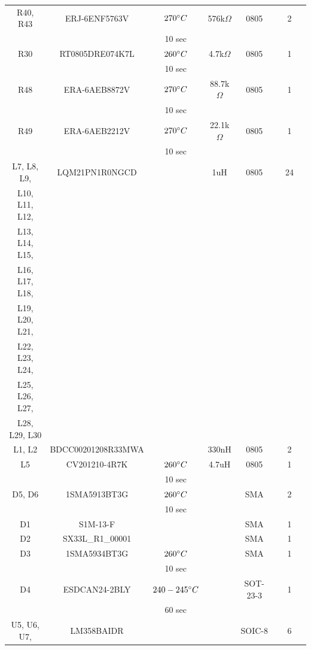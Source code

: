 \documentclass[10pt]{datasheet}
\begin{document}
\begin{longtable}{| c | c | c | c | c | c | c | c |}
    \hline
    R40, R43 & ERJ-6ENF5763V & $270\degree C$ & 576k$\Omega$ & 0805 & \cite{ref36} & 2 &\\
    & & 10 sec & & & & &\\
    \hline
    R30 & RT0805DRE074K7L & $260\degree C$ & 4.7k$\Omega$ & 0805 & \cite{ref27} & 1 &\\
    & & 10 sec & & & & &\\
    \hline
    R48 & ERA-6AEB8872V & $270\degree C$ & 88.7k$\Omega$ & 0805 & \cite{ref37} & 1 &\\
    & & 10 sec & & & & &\\
    \hline
    R49 & ERA-6AEB2212V & $270\degree C$ & 22.1k$\Omega$ & 0805 & \cite{ref37} & 1 &\\
    & & 10 sec & & & & &\\
    \hline
    L7, L8, L9, & LQM21PN1R0NGCD & & 1uH & 0805 & \cite{ref38} & 24 &\\
    L10, L11, L12, & & & & & & &\\
    L13, L14, L15, & & & & & & &\\
    L16, L17, L18, & & & & & & &\\
    L19, L20, L21, & & & & & & &\\
    L22, L23, L24, & & & & & & &\\
    L25, L26, L27, & & & & & & &\\
    L28, L29, L30 & & & & & & &\\
    \hline
    L1, L2 & BDCC00201208R33MWA & & 330nH & 0805 & \cite{ref39} & 2 &\\
    \hline
    L5 & CV201210-4R7K & $260\degree C$ & 4.7uH & 0805 & \cite{ref40} & 1 &\\
    & & 10 sec & & & & &\\
    \hline
    D5, D6 & 1SMA5913BT3G & $260\degree C$ & & SMA & \cite{ref1} & 2 &\\
    & & 10 sec & & & & &\\
    \hline
    D1 & S1M-13-F & & & SMA & \cite{ref41} & 1 &\\
    \hline
    D2 & SX33L\_R1\_00001 & & & SMA & \cite{ref3} & 1 &\\
    \hline
    D3 & 1SMA5934BT3G & $260\degree C$ & & SMA & \cite{ref1} & 1 &\\
    & & 10 sec & & & & &\\
    \hline
    D4 & ESDCAN24-2BLY & $240-245\degree C$ & & SOT-23-3 & \cite{ref41} & 1 &\\
    & & 60 sec & & & & &\\
    \hline
    U5, U6, U7, & LM358BAIDR & & & SOIC-8 & \cite{ref17} & 6 &\\

\end{longtable}
\end{document}
